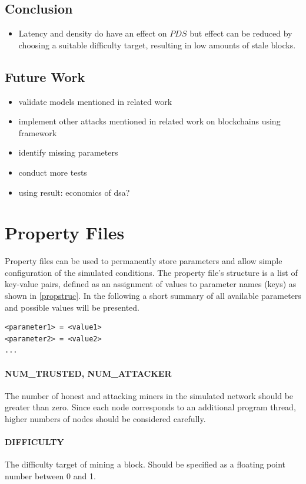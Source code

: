 \documentclass[a4paper,12pt,twoside]{report}
\begin{document}
\section{Conclusion}
\begin{itemize}
\item Latency and density do have an effect on $PDS$ but effect can be reduced by choosing a suitable difficulty target, resulting in low amounts of stale blocks.
\end{itemize}
\section{Future Work}
\begin{itemize}
\item validate models mentioned in related work
\item implement other attacks mentioned in related work on blockchains using framework
\item identify missing parameters
\item conduct more tests
\item using result: economics of dsa?
\end{itemize}




\appendix

\chapter{Property Files} \label{prop}
Property files can be used to permanently store parameters and allow simple configuration of the simulated conditions. The property file's structure is a list of key-value pairs, defined as an assignment of values to parameter names (keys) as shown in \autoref{propstruc}. In the following a short summary of all available parameters and possible values will be presented.
\begin{lstlisting}[caption=Property file structure,label=propstruc]
<parameter1> = <value1>
<parameter2> = <value2>
...
\end{lstlisting}
\subsubsection{NUM\_TRUSTED, NUM\_ATTACKER}
The number of honest and attacking miners in the simulated network should be greater than zero. Since each node corresponds to an additional program thread, higher numbers of nodes should be considered carefully.
\subsubsection{DIFFICULTY}
The difficulty target of mining a block. Should be specified as a floating point number between 0 and 1.
\end{document}
